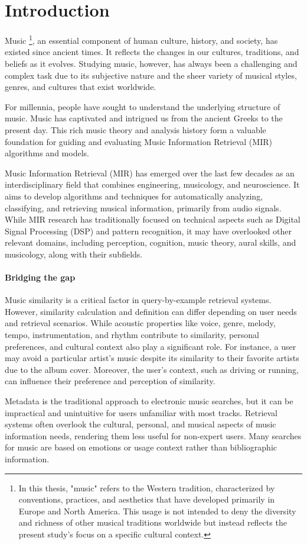 \chapter{Introduction}

Music \footnote{In this thesis, "music" refers to the Western tradition, characterized by conventions, practices, and aesthetics that have developed primarily in Europe and North America. This usage is not intended to deny the diversity and richness of other musical traditions worldwide but instead reflects the present study's focus on a specific cultural context.}, an essential component of human culture, history, and society, has existed since ancient times. It reflects the changes in our cultures, traditions, and beliefs as it evolves. Studying music, however, has always been a challenging and complex task due to its subjective nature and the sheer variety of musical styles, genres, and cultures that exist worldwide.

For millennia, people have sought to understand the underlying structure of music. Music has captivated and intrigued us from the ancient Greeks to the present day. This rich music theory and analysis history form a valuable foundation for guiding and evaluating Music Information Retrieval (MIR) algorithms and models.

Music Information Retrieval (MIR) has emerged over the last few decades as an interdisciplinary field that combines engineering, musicology, and neuroscience. It aims to develop algorithms and techniques for automatically analyzing, classifying, and retrieving musical information, primarily from audio signals. While MIR research has traditionally focused on technical aspects such as Digital Signal Processing (DSP) and pattern recognition, it may have overlooked other relevant domains, including perception, cognition, music theory, aural skills, and musicology, along with their subfields.

\subsubsection{Bridging the gap}

Music similarity is a critical factor in query-by-example retrieval systems. However, similarity calculation and definition can differ depending on user needs and retrieval scenarios. While acoustic properties like voice, genre, melody, tempo, instrumentation, and rhythm contribute to similarity, personal preferences, and cultural context also play a significant role. For instance, a user may avoid a particular artist's music despite its similarity to their favorite artists due to the album cover. Moreover, the user's context, such as driving or running, can influence their preference and perception of similarity. 

Metadata is the traditional approach to electronic music searches, but it can be impractical and unintuitive for users unfamiliar with most tracks. Retrieval systems often overlook the cultural, personal, and musical aspects of music information needs, rendering them less useful for non-expert users. Many searches for music are based on emotions or usage context rather than bibliographic information.